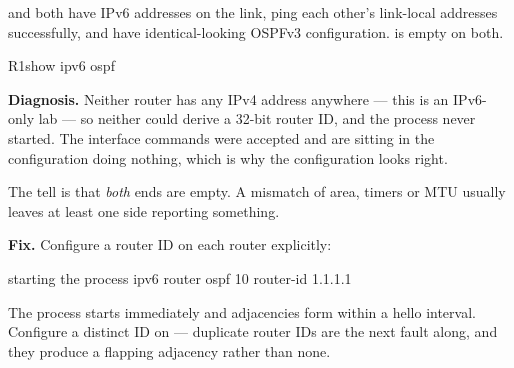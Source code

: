 \begin{breakfix}
 and  both have IPv6 addresses on the link, ping each other's
link-local addresses successfully, and have identical-looking OSPFv3
configuration.  is empty on both.

\begin{verify}{R1}{show ipv6 ospf}
\end{verify}

\textbf{Diagnosis.} Neither router has any IPv4 address anywhere --- this is an
IPv6-only lab --- so neither could derive a 32-bit router ID, and the process
never started. The interface commands were accepted and are sitting in the
configuration doing nothing, which is why the configuration looks right.

The tell is that \emph{both} ends are empty. A mismatch of area, timers or MTU
usually leaves at least one side reporting something.

\textbf{Fix.} Configure a router ID on each router explicitly:

\begin{config}{starting the process}
ipv6 router ospf 10
 router-id 1.1.1.1
\end{config}

The process starts immediately and adjacencies form within a hello interval.
Configure a distinct ID on  --- duplicate router IDs are the next fault
along, and they produce a flapping adjacency rather than none.
\end{breakfix}

